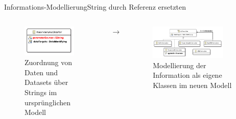 \documentclass{sdqbeamer}
\begin{document}
\begin{frame}{Informations-Modellierung}{String durch Referenz ersetzten}
	\begin{columns}
		\centering
		\begin{figure}
			\includegraphics[width=0.9\textwidth]{images/ParameterAndDataPair.pdf}
			\caption{Zuordnung von Daten und Datasets über Strings im ursprünglichen Modell}
		\end{figure}
		\centering
		$\rightarrow$
		\centering
		\begin{figure}
			\includegraphics[width=0.8\textwidth]{images/information.pdf}
			\caption{Modellierung der Information als eigene Klassen im neuen Modell}
		\end{figure}
	\end{columns}
\end{frame}
\end{document}
